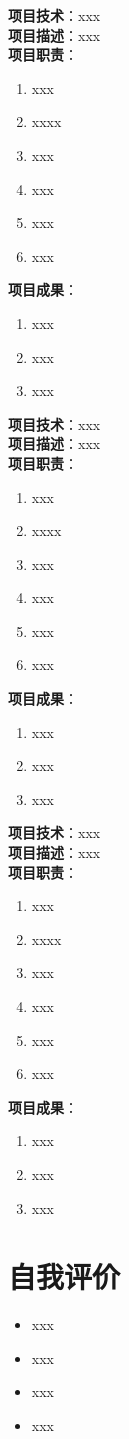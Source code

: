 \documentclass{resume}
\begin{document}
\textbf{项目技术}：xxx\\
\textbf{项目描述}：xxx\\
\textbf{项目职责}：
\begin{enumerate}[parsep=0.5ex]
  \item xxx
  \item xxxx
  \item xxx
  \item xxx
  \item xxx
  \item xxx
\end{enumerate}
\textbf{项目成果}：
\begin{enumerate}[parsep=0.5ex]
  \item xxx
  \item xxx
  \item xxx
\end{enumerate}
\textbf{}

\textbf{项目技术}：xxx\\
\textbf{项目描述}：xxx\\
\textbf{项目职责}：
\begin{enumerate}[parsep=0.5ex]
  \item xxx
  \item xxxx
  \item xxx
  \item xxx
  \item xxx
  \item xxx
\end{enumerate}
\textbf{项目成果}：
\begin{enumerate}[parsep=0.5ex]
  \item xxx
  \item xxx
  \item xxx
\end{enumerate}
\textbf{}

\textbf{项目技术}：xxx\\
\textbf{项目描述}：xxx\\
\textbf{项目职责}：
\begin{enumerate}[parsep=0.5ex]
  \item xxx
  \item xxxx
  \item xxx
  \item xxx
  \item xxx
  \item xxx
\end{enumerate}
\textbf{项目成果}：
\begin{enumerate}[parsep=0.5ex]
  \item xxx
  \item xxx
  \item xxx
\end{enumerate}
\textbf{}

\section{自我评价}

\begin{itemize}[parsep=0.5ex]
  \item xxx
  \item xxx
  \item xxx
  \item xxx
\end{itemize}
\end{document}
